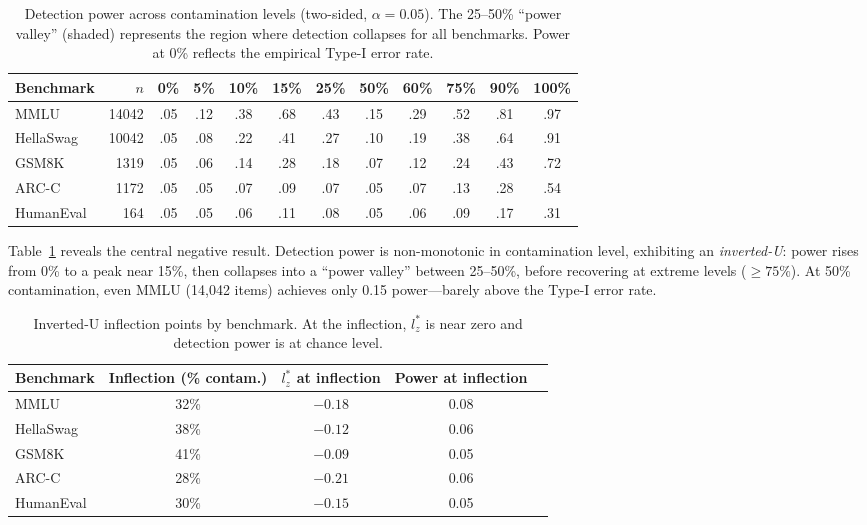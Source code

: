 \documentclass[11pt,a4paper]{article}
\begin{document}
\begin{table}[t]
\centering
\caption{Detection power across contamination levels (two-sided, $\alpha = 0.05$). The 25--50\% ``power valley'' (shaded) represents the region where detection collapses for all benchmarks. Power at 0\% reflects the empirical Type-I error rate.}
\label{tab:power_matrix}
\small
\begin{tabular}{@{}lrcccccccccc@{}}
\toprule
Benchmark & $n$ & 0\% & 5\% & 10\% & 15\% & 25\% & 50\% & 60\% & 75\% & 90\% & 100\% \\
\midrule
MMLU & 14042 & .05 & .12 & .38 & .68 & .43 & .15 & .29 & .52 & .81 & .97 \\
HellaSwag & 10042 & .05 & .08 & .22 & .41 & .27 & .10 & .19 & .38 & .64 & .91 \\
GSM8K & 1319 & .05 & .06 & .14 & .28 & .18 & .07 & .12 & .24 & .43 & .72 \\
ARC-C & 1172 & .05 & .05 & .07 & .09 & .07 & .05 & .07 & .13 & .28 & .54 \\
HumanEval & 164 & .05 & .05 & .06 & .11 & .08 & .05 & .06 & .09 & .17 & .31 \\
\bottomrule
\end{tabular}
\end{table}

Table~\ref{tab:power_matrix} reveals the central negative result. Detection power is non-monotonic in contamination level, exhibiting an \emph{inverted-U}: power rises from 0\% to a peak near 15\%, then collapses into a ``power valley'' between 25--50\%, before recovering at extreme levels ($\geq 75\%$). At 50\% contamination, even MMLU (14{,}042 items) achieves only 0.15 power---barely above the Type-I error rate.

\begin{table}[t]
\centering
\caption{Inverted-U inflection points by benchmark. At the inflection, $l_z^*$ is near zero and detection power is at chance level.}
\label{tab:inflection}
\small
\begin{tabular}{@{}lcccc@{}}
\toprule
Benchmark & Inflection (\% contam.) & $l_z^*$ at inflection & Power at inflection \\
\midrule
MMLU & 32\% & $-0.18$ & 0.08 \\
HellaSwag & 38\% & $-0.12$ & 0.06 \\
GSM8K & 41\% & $-0.09$ & 0.05 \\
ARC-C & 28\% & $-0.21$ & 0.06 \\
HumanEval & 30\% & $-0.15$ & 0.05 \\
\bottomrule
\end{tabular}
\end{table}
\end{document}

